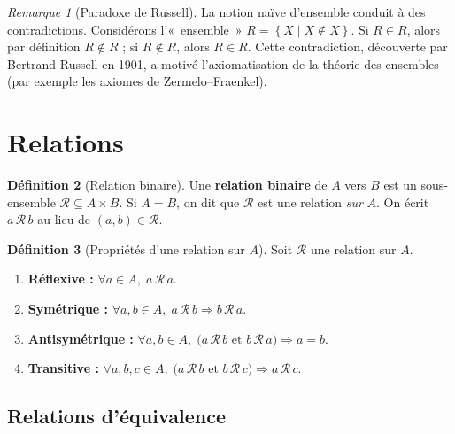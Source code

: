 \documentclass[12pt,a4paper,openany]{book}
\theoremstyle{definition}
\newtheorem{definition}{Définition}[chapter]
\theoremstyle{plain}
\theoremstyle{remark}
\newtheorem{remarque}[definition]{Remarque}
\newcommand{\set}[1]{\left\{#1\right\}}
\begin{document}
\begin{remarque}[Paradoxe de Russell]\label{rem:russell}
La notion naïve d'ensemble conduit à des contradictions. Considérons
l'«~ensemble~» $R = \set{X \mid X \notin X}$. Si $R \in R$, alors par
définition $R \notin R$ ; si $R \notin R$, alors $R \in R$. Cette contradiction,
découverte par Bertrand Russell en 1901, a motivé l'axiomatisation de la
théorie des ensembles (par exemple les axiomes de Zermelo--Fraenkel).
\end{remarque}

\section{Relations}\label{sec:relations}

\begin{definition}[Relation binaire]\label{def:relation-binaire}
Une \textbf{relation binaire} de $A$ vers $B$ est un sous-ensemble
$\mathcal{R} \subseteq A \times B$. Si $A = B$, on dit que $\mathcal{R}$
est une relation \emph{sur} $A$. On écrit $a\,\mathcal{R}\,b$ au lieu de
$(a,b) \in \mathcal{R}$.
\end{definition}

\begin{definition}[Propriétés d'une relation sur $A$]\label{def:proprietes-relation}
Soit $\mathcal{R}$ une relation sur $A$.
\begin{enumerate}
  \item \textbf{Réflexive :} $\forall a \in A,\; a\,\mathcal{R}\,a$.
  \item \textbf{Symétrique :} $\forall a,b \in A,\; a\,\mathcal{R}\,b \Rightarrow b\,\mathcal{R}\,a$.
  \item \textbf{Antisymétrique :} $\forall a,b \in A,\;
    \bigl(a\,\mathcal{R}\,b \text{ et } b\,\mathcal{R}\,a\bigr) \Rightarrow a = b$.
  \item \textbf{Transitive :} $\forall a,b,c \in A,\;
    \bigl(a\,\mathcal{R}\,b \text{ et } b\,\mathcal{R}\,c\bigr) \Rightarrow a\,\mathcal{R}\,c$.
\end{enumerate}
\end{definition}

\subsection{Relations d'équivalence}\label{subsec:equiv}
\end{document}
